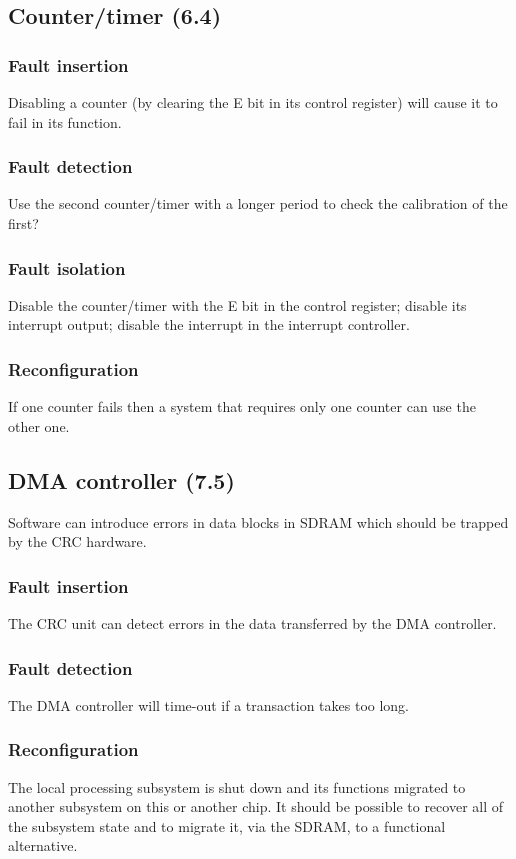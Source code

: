 \documentclass[11pt]{article}
\begin{document}
\subsection{Counter/timer (6.4)}
\subsubsection*{Fault insertion}
Disabling a counter (by clearing the E bit in its control register) will cause it to fail in its function.
\subsubsection*{Fault detection}
Use the second counter/timer with a longer period to check the calibration of the first?
\subsubsection*{Fault isolation}
Disable the counter/timer with the E bit in the control register; disable its interrupt output; disable
the interrupt in the interrupt controller.
\subsubsection*{Reconfiguration}
If one counter fails then a system that requires only one counter can use the other one.

\subsection{DMA controller (7.5)}
Software can introduce errors in data blocks in SDRAM which should be trapped by the CRC
hardware.
\subsubsection*{Fault insertion}
The CRC unit can detect errors in the data transferred by the DMA controller.
\subsubsection*{Fault detection}
The DMA controller will time-out if a transaction takes too long.
\subsubsection*{Reconfiguration}
The local processing subsystem is shut down and its functions migrated to another subsystem on
this or another chip. It should be possible to recover all of the subsystem state and to migrate it, via
the SDRAM, to a functional alternative.
\end{document}
